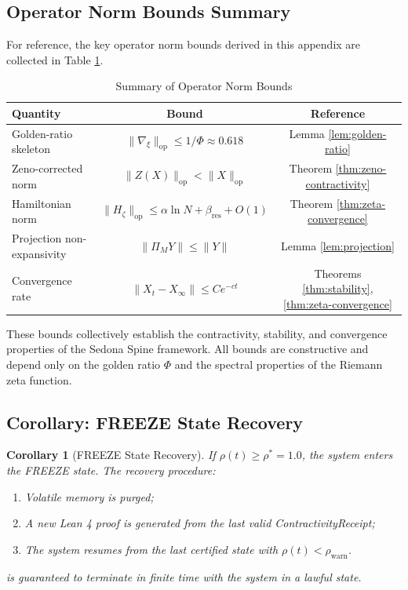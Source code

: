 \documentclass[12pt]{article}
\theoremstyle{plain}
\newtheorem{corollary}[theorem]{Corollary}
\theoremstyle{definition}
\theoremstyle{remark}
\begin{document}
\subsection{Operator Norm Bounds Summary}

For reference, the key operator norm bounds derived in this appendix are collected in Table \ref{tab:norm-bounds}.

\begin{table}[h]
\centering
\begin{tabular}{|l|c|c|}
\hline
\textbf{Quantity} & \textbf{Bound} & \textbf{Reference} \\
\hline
Golden-ratio skeleton & $\|\nabla_{\xi}\|_{\text{op}} \leq 1/\Phi \approx 0.618$ & Lemma \ref{lem:golden-ratio} \\
\hline
Zeno-corrected norm & $\|Z(X)\|_{\text{op}} < \|X\|_{\text{op}}$ & Theorem \ref{thm:zeno-contractivity} \\
\hline
Hamiltonian norm & $\|H_\zeta\|_{\text{op}} \leq \alpha\ln N + \beta_{\text{res}} + O(1)$ & Theorem \ref{thm:zeta-convergence} \\
\hline
Projection non-expansivity & $\|\Pi_M Y\| \leq \|Y\|$ & Lemma \ref{lem:projection} \\
\hline
Convergence rate & $\|X_t - X_\infty\| \leq C e^{-ct}$ & Theorems \ref{thm:stability}, \ref{thm:zeta-convergence} \\
\hline
\end{tabular}
\caption{Summary of Operator Norm Bounds}
\label{tab:norm-bounds}
\end{table}

These bounds collectively establish the contractivity, stability, and convergence properties of the Sedona Spine framework. All bounds are constructive and depend only on the golden ratio $\Phi$ and the spectral properties of the Riemann zeta function.

\subsection{Corollary: FREEZE State Recovery}

\begin{corollary}[FREEZE State Recovery]
\label{cor:freeze}
If $\rho(t) \geq \rho^* = 1.0$, the system enters the FREEZE state. The recovery procedure:
\begin{enumerate}
    \item Volatile memory is purged;
    \item A new Lean 4 proof is generated from the last valid ContractivityReceipt;
    \item The system resumes from the last certified state with $\rho(t) < \rho_{\text{warn}}$.
\end{enumerate}
is guaranteed to terminate in finite time with the system in a lawful state.
\end{corollary}
\end{document}
